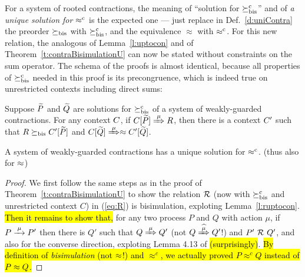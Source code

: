 For a system of rooted contractions, the meaning of 
``solution for $\mathrel{\succeq^{\rm{c}}_{\rm{bis}}}$'' and of \emph{a unique solution for $\mathrel{\approx^{\rm{c}}}$}
is the expected one --- just replace in Def.~\ref{d:uniContra}  the preorder 
$\mathrel{\succeq_{\rm{bis}}}$ with $\mathrel{\succeq^{\rm{c}}_{\rm{bis}}}$, and the equivalence 
$\approx$ with $\mathrel{\approx^{\rm{c}}}$.
%
For this new relation, the analogous of Lemma~\ref{l:uptocon} and of
Theorem~\ref{t:contraBisimulationU} can now be stated without constraints on the sum
operator.
The schema of the proofs is almost identical, because all 
properties of $\mathrel{\succeq^{\rm{c}}_{\rm{bis}}}$ needed in this proof is its precongruence, which is
indeed true on unrestricted contexts including direct sums:
\begin{lemma}
\label{l:ruptocon}
Suppose $\widetilde P$ and $\widetilde Q$ are solutions  for $\mathrel{\succeq^{\rm{c}}_{\rm{bis}}}$ 
 of a system of weakly-guarded
contractions.
For any context $C$, 
if  $\ct{\til P}\Arr{\mu}  R$,
 then 
there is a  context $C'$
such that $R \mathrel{\succeq_{\rm{bis}}} C' [\widetilde P]$ and  $\ct{\til Q} \Arr{\mu}
 \wb \ctp{\til Q}$.
\end{lemma}

\begin{theorem}
\label{t:rcontraBisimulationU}
A system of weakly-guarded contractions has a unique solution 
 for $\mathrel{\approx^{\rm{c}}}$. (thus also for $\approx$)
\end{theorem} 

\begin{proof}
We first follow the same steps as in the proof of Theorem~\ref{t:contraBisimulationU} to show the relation ${\cal R}$ (now
with $\mathrel{\succeq^{\rm{c}}_{\rm{bis}}}$ and unrestricted context $C$) in (\ref{eq:R}) is bisimulation,
exploting Lemma~\ref{l:ruptocon}. \hl{Then it remains to show that,} for
any two process $P$ and $Q$ with action $\mu$, if $P \arr{\mu} P'$ then
there is $Q'$ such that $Q \Arr{\mu} Q'$ (not $Q \Arcap{\mu} Q'$!) and
$P'\ {\cal R}\ Q'$, and also for the converse direction, exploting Lemma
4.13 of \cite{Mil89} \hl{(surprisingly)}. \hl{By definition of
\emph{bisimulation} (not $\approx$!) and $\approx^c$, we actually proved $P
\approx^c Q$ instead of $P \approx Q$.}
\end{proof}
